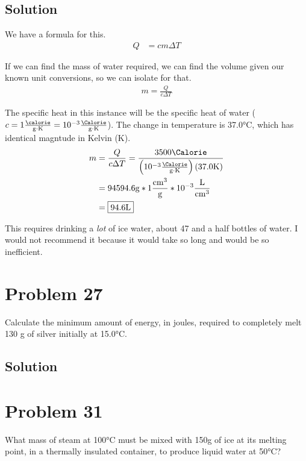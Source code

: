 \documentclass[12pt]{article}
\begin{document}
        \subsection{Solution}
            We have a formula for this. 
            \begin{align}
                Q   &=  cm \Delta T
            \end{align}

            If we can find the mass of water required, we can find the volume given our known unit conversions, so we can isolate for that.
            \begin{gather}
                m   =   \frac{Q}{c \Delta T}
            \end{gather}

            The specific heat in this instance will be the specific heat of water ($c = 1 \unit{\frac{\calorie}{\gram\cdot\kelvin}} = 10^{-3} \unit{\frac{\Calorie}{\gram\cdot\kelvin}}$). 
            The change in temperature is 37.0\unit{\celsius}, which has identical magntude in Kelvin (\unit{K}). 
            \begin{align}
                m   &=  \frac{Q}{c \Delta T}
                    =   \frac{3500\unit{\Calorie}}{\left( 10^{-3} \unit{\frac{\Calorie}{\gram\cdot\kelvin}} \right) \left( 37.0 \unit{\kelvin} \right)}\\
                    &=  94594.6 \unit{\gram} * 1 \unit{\frac{\centi\meter^3}{\gram}} * 10^{-3} \unit{\frac{\liter}{\centi\meter^3}}\\
                    &=  \boxed{94.6 \unit{\liter}}
            \end{align}

            This requires drinking a \textit{lot} of ice water, about 47 and a half bottles of water. 
            I would not recommend it because it would take so long and would be so inefficient. 

    \pagebreak
    \section{Problem 27}
        Calculate the minimum amount of energy, in joules, required to completely melt 130 g of silver initially at 15.0\unit{\celsius}.

        \subsection{Solution}

    \pagebreak
    \section{Problem 31}
        What mass of steam at 100\unit{\celsius} must be mixed with 150\unit{\gram} of ice at its melting point, in a thermally insulated container, to produce liquid water at 50\unit{\celsius}?
\end{document}
